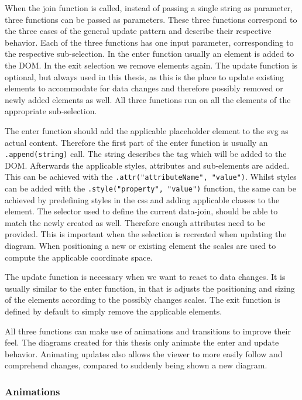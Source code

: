 When the join function is called, instead of passing a single string as parameter, three functions can be passed as parameters. These three functions correspond to the three cases of the general update pattern and describe their respective behavior. Each of the three functions has one input parameter, corresponding to the respective sub-selection. In the enter function usually an element is added to the DOM. In the exit selection we remove elements again. The update function is optional, but always used in this thesis, as this is the place to update existing elements to accommodate for data changes and therefore possibly removed or newly added elements as well. All three functions run on all the elements of the appropriate sub-selection.

The enter function should add the applicable placeholder element to the svg as actual content. Therefore the first part of the enter function is usually an \texttt{.append(string)} call. The string describes the tag which will be added to the DOM. Afterwards the applicable styles, attributes and sub-elements are added. This can be achieved with the \texttt{.attr("attributeName", "value")}. Whilst styles can be added with the \texttt{.style("property", "value")} function, the same can be achieved by predefining styles in the css and adding applicable classes to the element. The selector used to define the current data-join, should be able to match the newly created as well. Therefore enough attributes need to be provided. This is important when the selection is recreated when updating the diagram. When positioning a new or existing element the scales are used to compute the applicable coordinate space.

The update function is necessary when we want to react to data changes. It is usually similar to the enter function, in that is adjusts the positioning and sizing of the elements according to the possibly changes scales. The exit function is defined by default to simply remove the applicable elements.

All three functions can make use of animations and transitions to improve their feel. The diagrams created for this thesis only animate the enter and update behavior. Animating updates also allows the viewer to more easily follow and comprehend changes, compared to suddenly being shown a new diagram.

\subsubsection{Animations}

